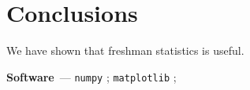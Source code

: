 \documentclass[modern]{aastex631}
\renewcommand{\paragraph}[1]{\medskip\par\noindent\textbf{#1}~---}
\begin{document}











\section{Conclusions} \label{sec:conclusions}
We have shown that freshman statistics is useful.

\paragraph{Software}
\texttt{numpy} \citep{numpy}; 
\texttt{matplotlib} \citep{matplotlib}; 



%
\end{document}
